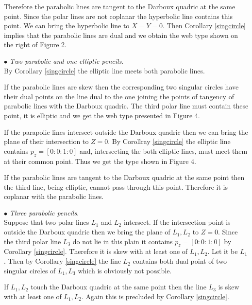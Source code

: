 \documentclass[11pt,a4paper]{article}
\begin{document}
Therefore the parabolic lines are tangent to the Darboux quadric at the same point. Since the polar lines are not coplanar the hyperbolic line contains this point. We can bring the hyperbolic line to $X=Y=0$. Then Corollary \ref{singcircle} implies that the parabolic lines are dual and we obtain   
the web type shown on the right of Figure 2.
 



$\bullet${ \it Two parabolic and one elliptic pencils}.\\
By Corollary \ref{singcircle}  the elliptic line meets both parabolic lines. 

If the parabolic lines are skew then the corresponding two singular circles have their dual points on the line dual to the one joining the points of tangency of parabolic lines with the Darboux quadric. The third polar line must contain these point, it is elliptic  and we get 
the web type presented in Figure 4. 

If the parapolic lines intersect outside the Darboux quadric then we can bring the plane of their intersection to $Z=0$. By Corollray \ref{singcircle} the elliptic line contains $p_z=[0:0:1:0]$ and, intersecting the both elliptic lines, must meet them at their common point. Thus we get the type shown in Figure 4. 

If the parabolic lines are tangent to the Darboux quadric at the same point then the third line, being elliptic, cannot pass through this point. Therefore it is coplanar with the parabolic lines. 
 
 $\bullet${ \it Three parabolic pencils}.\\ 
Suppose that two polar lines $L_1$ and $L_2$ intersect. If the intersection point is outside the Darboux quadric then we bring the plane of $L_1,L_2$ to $Z=0$. Since the third polar line $L_3$ do not lie in this plain it contains $p_z=[0:0:1:0]$ by Corollary \ref{singcircle}. Therefore it is skew with at least one of $L_1,L_2$. Let it be $L_1$. Then by Corollary \ref{singcircle} the line $L_2$ contains both dual point of two singular circles of $L_1,L_3$ which is obviously not possible. 

If $L_1,L_2$ touch the Darboux quadric at the same point then the line $L_3$ is skew with at least one of $L_1,L_2$. Again this  is precluded by Corollary \ref{singcircle}. 
\end{document}
